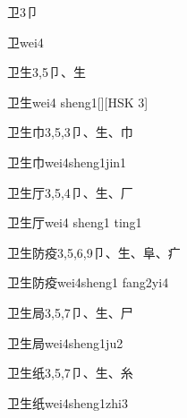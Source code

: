 \begin{Entry}{卫}{3}{⼙}
  \begin{Phonetics}{卫}{wei4}
  \end{Phonetics}
\end{Entry}

\begin{Entry}{卫生}{3,5}{⼙、⽣}
  \begin{Phonetics}{卫生}{wei4 sheng1}[][HSK 3]
  \end{Phonetics}
\end{Entry}

\begin{Entry}{卫生巾}{3,5,3}{⼙、⽣、⼱}
  \begin{Phonetics}{卫生巾}{wei4sheng1jin1}
  \end{Phonetics}
\end{Entry}

\begin{Entry}{卫生厅}{3,5,4}{⼙、⽣、⼚}
  \begin{Phonetics}{卫生厅}{wei4 sheng1 ting1}
  \end{Phonetics}
\end{Entry}

\begin{Entry}{卫生防疫}{3,5,6,9}{⼙、⽣、⾩、⽧}
  \begin{Phonetics}{卫生防疫}{wei4sheng1 fang2yi4}
  \end{Phonetics}
\end{Entry}

\begin{Entry}{卫生局}{3,5,7}{⼙、⽣、⼫}
  \begin{Phonetics}{卫生局}{wei4sheng1ju2}
  \end{Phonetics}
\end{Entry}

\begin{Entry}{卫生纸}{3,5,7}{⼙、⽣、⽷}
  \begin{Phonetics}{卫生纸}{wei4sheng1zhi3}
  \end{Phonetics}
\end{Entry}

